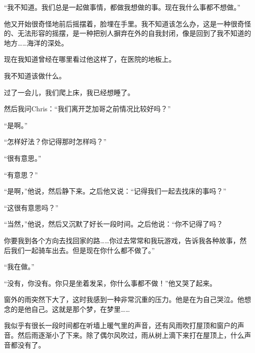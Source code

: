 \documentclass[UTF8]{article}
\begin{document}
\par “我不知道。我们总是一起做事情，都做我想做的事。现在我什么事都不想做。”
\par 他又开始很奇怪地前后摇摆着，脸埋在手里。我不知道该怎么办，这是一种很奇怪的、无法形容的摇摆，是一种把别人摒弃在外的自我封闭，像是回到了我不知道的地方……海洋的深处。
\par 现在我知道曾经在哪里看过他这样了，在医院的地板上。
\par 我不知道该做什么。
\par 过了一会儿，我们爬上床，我已经想睡了。
\par 然后我问Chris：“我们离开芝加哥之前情况比较好吗？”
\par “是啊。”
\par “怎样好法？你记得那时怎样吗？”
\par “很有意思。”
\par “有意思？”
\par “是啊，”他说，然后静下来。之后他又说：“记得我们一起去找床的事吗？”
\par “这很有意思吗？”
\par “当然，”他说，然后又沉默了好长一段时间。之后他说：“你不记得了吗？
\par 你要我到各个方向去找回家的路……你过去常常和我玩游戏，告诉我各种故事，然后我们一起骑车出去。但是现在你什么都不做了。”
\par “我在做。”
\par “没有，你没有。你只是坐着发呆，你什么事都不做！”他又哭了起来。
\par 窗外的雨突然下大了，这时我感到一种非常沉重的压力。他是在为自己哭泣。他想念的是他自己。这就是那个梦，在梦里……
\par 我似乎有很长一段时间都在听墙上暖气里的声音，还有风雨吹打屋顶和窗户的声音。然后雨逐渐小了下来。除了偶尔风吹过，雨从树上滴下来打在屋顶上，什么声音都没有了。
\end{document}
